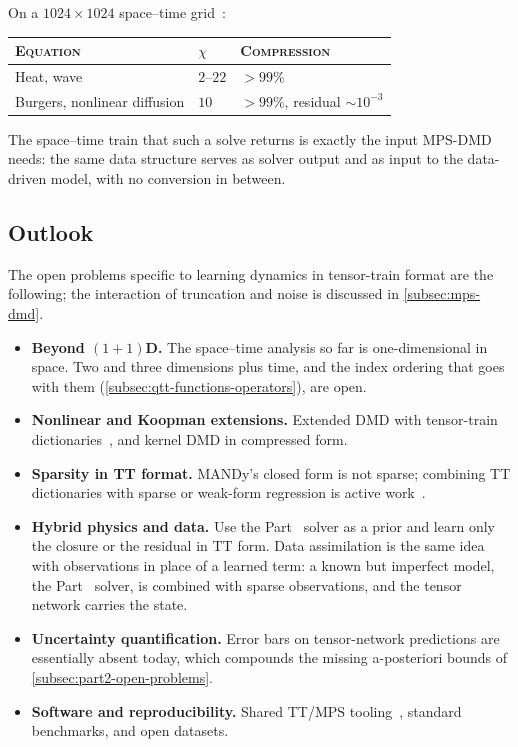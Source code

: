 On a $1024 \times 1024$ space--time grid~\cite{Peddinti2025a}:
\begin{center}
  \begin{tabular}{@{}llp{}@{}}
    \toprule
    \textsc{Equation} & $\chi$ & \textsc{Compression} \\
    \midrule
    Heat, wave                    & $2$--$22$ & $> 99\%$ \\
    Burgers, nonlinear diffusion  & $10$      & $> 99\%$, residual
                                                $\sim\!10^{-3}$ \\
    \bottomrule
  \end{tabular}
\end{center}
The space--time train that such a solve returns is exactly the input MPS-DMD
needs: the same data structure serves as solver output and as input to the
data-driven model, with no conversion in between.

\subsection{Outlook}
\label{subsec:part4-outlook}

The open problems specific to learning dynamics in tensor-train format are the
following; the interaction of truncation and noise is discussed in
\cref{subsec:mps-dmd}.
\begin{itemize}
  \item \textbf{Beyond $(1+1)$D.} The space--time analysis so far is
    one-dimensional in space. Two and three dimensions plus time, and the index
    ordering that goes with them (\cref{subsec:qtt-functions-operators}), are
    open.
  \item \textbf{Nonlinear and Koopman extensions.} Extended DMD with
    tensor-train dictionaries~\cite{Williams2015,Klus2018}, and kernel DMD in
    compressed form.
  \item \textbf{Sparsity in TT format.} MANDy's closed form is not sparse;
    combining TT dictionaries with sparse or weak-form regression is active
    work~\cite{Goessmann2020,Houser2026}.
  \item \textbf{Hybrid physics and data.} Use the Part~ solver as a
    prior and learn only the closure or the residual in TT form. Data
    assimilation is the same idea with observations in place of a learned
    term: a known but imperfect model, the Part~ solver, is combined
    with sparse observations, and the tensor network carries the state.
  \item \textbf{Uncertainty quantification.} Error bars on tensor-network
    predictions are essentially absent today, which compounds the missing
    a-posteriori bounds of \cref{subsec:part2-open-problems}.
  \item \textbf{Software and reproducibility.} Shared TT/MPS
    tooling~\cite{Nunez2025}, standard benchmarks, and open datasets.
\end{itemize}

